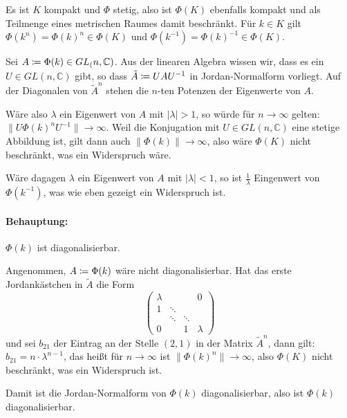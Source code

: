 \documentclass{article}
\begin{document}
Es ist $K$ kompakt und $\Phi$ stetig, also ist $\Phi(K)$ ebenfalls kompakt und als Teilmenge eines metrischen Raumes damit beschränkt. Für $k\in K$ gilt $\Phi(k^n)=\Phi(k)^n\in\Phi(K)$ und $\Phi(k^{-1})=\Phi(k)^{-1}\in \Phi(K)$.

Sei $A\mathrel{\mbox{$\coloneqq$}} \Phi(k)\in GL_(n,\mathbb C)$. Aus der linearen Algebra wissen wir, dass es ein $U\in GL(n,\mathbb C)$ gibt, so dass $\tilde A \mathrel{\mbox{$\coloneqq$}} UAU^{-1}$ in Jordan-Normalform vorliegt. Auf der Diagonalen von $\tilde A^n$ stehen die $n$-ten Potenzen der Eigenwerte von $A$.

Wäre also $\lambda$ ein Eigenwert von $A$ mit $|\lambda|>1$, so würde für $n\to\infty$ gelten: $\|U\Phi(k)^nU^{-1}\|\to \infty$. Weil die Konjugation mit $U\in GL(n,\mathbb C)$ eine stetige Abbildung ist, gilt dann auch $\|\Phi(k)\|\to\infty$, also wäre $\Phi(K)$ nicht beschränkt, was ein Widerspruch wäre.

Wäre dagagen $\lambda$ ein Eigenwert von $A$ mit $|\lambda|<1$, so ist $\frac1\lambda$ Eingenwert von $\Phi(k^{-1})$, was wie eben gezeigt ein Widerspruch ist.

\paragraph{Behauptung:} $\Phi(k)$ ist diagonalisierbar.

Angenommen, $A\mathrel{\mbox{$\coloneqq$}} \Phi(k)$ wäre nicht diagonalisierbar. Hat das erste Jordankästchen in $\tilde A$ die Form 
\[
\begin{pmatrix}
\lambda &  & & 0\\
1 &\ddots & & \\
  & \ddots &\ddots &\\
0 & & 1 &\lambda
\end{pmatrix}
\]
und sei $b_{21}$ der Eintrag an der Stelle $(2,1)$ in der Matrix $\tilde A^n$, dann gilt:
$b_{21} = n\cdot \lambda^{n-1}$, das heißt für $n\to\infty$ ist $\|\Phi(k)^n\|\to \infty$, also $\Phi(K)$ nicht beschränkt, was ein Widerspruch ist.

Damit ist die Jordan-Normalform von $\Phi(k)$ diagonalisierbar, also ist $\Phi(k)$ diagonalisierbar.
\end{document}
